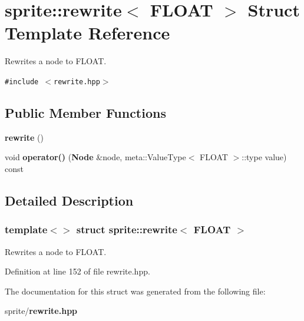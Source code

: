 \section{sprite::rewrite$<$ FLOAT $>$ Struct Template Reference}
\label{structsprite_1_1rewrite_3_01FLOAT_01_4}
Rewrites a node to FLOAT.  


{\tt \#include $<$rewrite.hpp$>$}

\subsection*{Public Member Functions}
\begin{CompactItemize}
\item 
{\bf rewrite} ()\label{structsprite_1_1rewrite_3_01FLOAT_01_4_a0}

\item 
void {\bf operator()} ({\bf Node} \&node, meta::Value\-Type$<$ FLOAT $>$::type value) const \label{structsprite_1_1rewrite_3_01FLOAT_01_4_a1}

\end{CompactItemize}


\subsection{Detailed Description}
\subsubsection*{template$<$$>$ struct sprite::rewrite$<$ FLOAT $>$}

Rewrites a node to FLOAT. 



Definition at line 152 of file rewrite.hpp.

The documentation for this struct was generated from the following file:\begin{CompactItemize}
\item 
sprite/{\bf rewrite.hpp}\end{CompactItemize}
